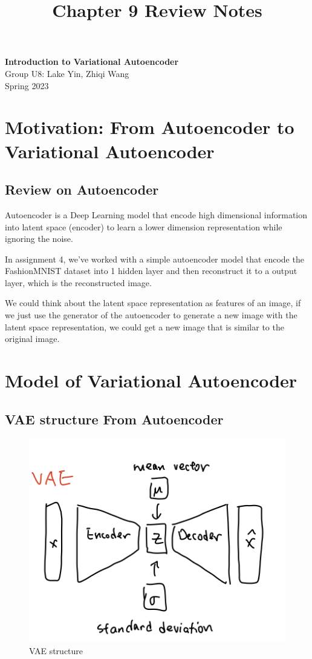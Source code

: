 \documentclass[11pt]{article}
\theoremstyle{definition}
\begin{document}
\setcounter{section}{0}
\title{Chapter 9 Review Notes}

\thispagestyle{empty}

\begin{center}
{\LARGE \bf Introduction to Variational Autoencoder}\\
{\large Group U8: Lake Yin, Zhiqi Wang}\\
Spring 2023
\end{center}
\section{Motivation: From Autoencoder to Variational Autoencoder}
\subsection{Review on Autoencoder}
Autoencoder is a Deep Learning model that encode high dimensional information into latent space (encoder) to learn a lower dimension representation while ignoring the noise. 

In assignment 4, we've worked with a simple autoencoder model that encode the FashionMNIST dataset into 1 hidden layer and then reconstruct it to a output layer, which is the reconstructed image.

We could think about the latent space representation as features of an image, if we just use the generator of the autoencoder to generate a new image with the latent space representation, we could get a new image that is similar to the original image.

\section{Model of Variational Autoencoder}

\subsection{VAE structure From Autoencoder}
\begin{figure}[h]
    \begin{center}
\includegraphics*{vae-graph.png}
    \end{center}
\caption{VAE structure}
\end{figure}
\end{document}
